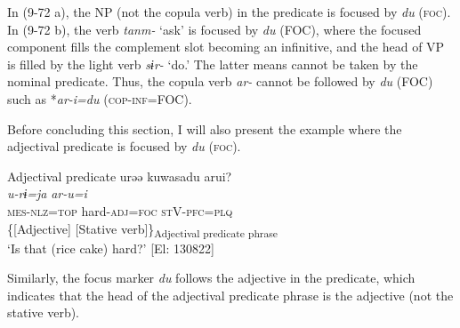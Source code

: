 In (9-72 a), the NP (not the copula verb) in the predicate is focused by \textit{du} (\textsc{foc}). In (9-72 b), the verb \textit{tanm-} ‘ask’ is focused by \textit{du} (FOC), where the focused component fills the complement slot becoming an infinitive, and the head of VP is filled by the light verb \textit{sɨr-} ‘do.’ The latter means cannot be taken by the nominal predicate. Thus, the copula verb \textit{ar-} cannot be followed by \textit{du} (FOC) such as *\textit{ar-i=du} (\textsc{cop}-\textsc{inf}=FOC).

Before concluding this section, I will also present the example where the adjectival predicate is focused by \textit{du} (\textsc{foc}).

\ea   Adjectival predicate \label{ex:9.73}
 \gllll  urəə  kuwasadu  arui?\\
    \textit{u-rɨ=ja}  \textit{}  \textit{ar-u=i}\\
    \textsc{mes}-\textsc{nlz}=\textsc{top}  hard-\textsc{adj}=\textsc{foc}  \textsc{st}V-\textsc{pfc}=\textsc{plq}\\
      \{[Adjective]  [Stative verb]\}\textsubscript{Adjectival predicate phrase}\\
    \glt     ‘Is that (rice cake) hard?’ [El: 130822]
\z

Similarly, the focus marker \textit{du} follows the adjective in the predicate, which indicates that the head of the adjectival predicate phrase is the adjective (not the stative verb).

